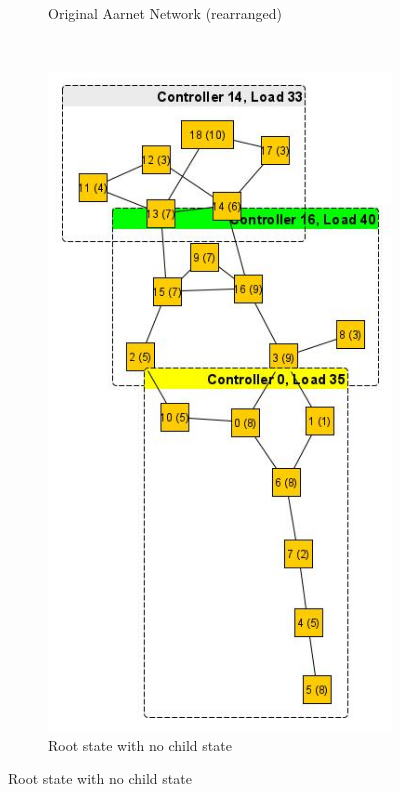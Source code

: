 \documentclass[preprint,12pt]{elsarticle}
\begin{document}
\begin{figure}
\begin{subfigure}{0.3\textwidth}
			\caption{Original Aarnet Network (rearranged)}
			\label{fig:aarnet2009}
		\end{subfigure}
		~
		\begin{subfigure}{0.3\textwidth}
			\includegraphics[width=\linewidth]{Images/Aarnet_Load_1.jpg}
			\caption{Root state with no child state}
			\label{fig:aarnet2009l1}

\end{subfigure}
\end{figure}
\end{document}
